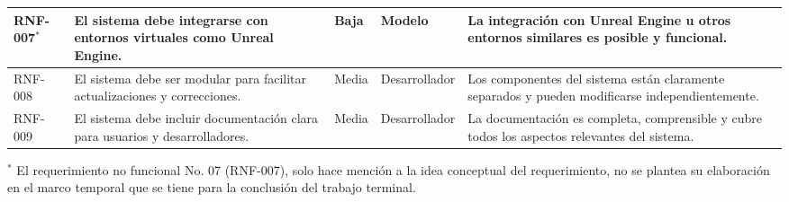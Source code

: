 \begin{table}[H]
\begin{adjustbox}{width=\textwidth}
\begin{tabular}{p{1.2cm}p{5cm}p{1.75cm}p{2.25cm}p{5cm}}
    \hline %
    RNF-007$^{*}$ & El sistema debe integrarse con entornos virtuales como Unreal Engine. & Baja & Modelo & La integración con Unreal Engine u otros entornos similares es posible y funcional. \\
    \hline %
    RNF-008 & El sistema debe ser modular para facilitar actualizaciones y correcciones. & Media & Desarrollador & Los componentes del sistema están claramente separados y pueden modificarse independientemente. \\
    \hline %
    RNF-009 & El sistema debe incluir documentación clara para usuarios y desarrolladores. & Media & Desarrollador & La documentación es completa, comprensible y cubre todos los aspectos relevantes del sistema. \\
    \hline %
    \end{tabular}
    \end{adjustbox}

    \vspace{0.5em}
    \begin{minipage}{\textwidth}
    \footnotesize{$^{*}$ El requerimiento no funcional No. 07 (RNF-007), solo hace mención a la idea conceptual del requerimiento, no se plantea su elaboración en el marco temporal que se tiene para la conclusión del trabajo terminal.}
    \end{minipage}
\end{table}
\newpage